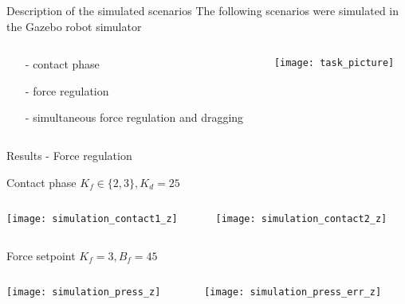 \begin{frame}{Description of the simulated scenarios}
  The following scenarios were simulated in the Gazebo robot simulator
  \begin{columns}
    \begin{column}{0.5\textwidth}
      \begin{itemize}
        \item[-]contact phase
        \item[-]force regulation 
        \item[-]simultaneous force regulation and dragging
      \end{itemize}
    \end{column}
    \begin{column}{0.5\textwidth}
      \texttt{[image: task\_picture]}
    \end{column}
  \end{columns}
\end{frame}

\begin{frame}{Results - Force regulation}
  \begin{block}{Contact phase \hfill$K_f \in \{2,3\}, K_d = 25$}
    \vskip0.03in
    \begin{columns}
      \begin{column}{0.38\textwidth}
        \texttt{[image: simulation\_contact1\_z]}
      \end{column}
      \begin{column}{0.38\textwidth}
        \texttt{[image: simulation\_contact2\_z]}
      \end{column}
    \end{columns}
  \end{block}
  \begin{block}{Force setpoint \hfill$K_f = 3, B_f = 45 $}
    \vskip0.03in
    \begin{columns}
      \begin{column}{0.38\textwidth}
        \texttt{[image: simulation\_press\_z]}
      \end{column}
      \begin{column}{0.38\textwidth}
        \texttt{[image: simulation\_press\_err\_z]}
      \end{column}
    \end{columns}
  \end{block}
\end{frame}

